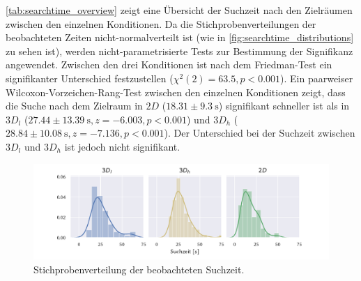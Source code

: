\autoref{tab:searchtime_overview} zeigt eine Übersicht der Suchzeit nach den Zielräumen zwischen den einzelnen Konditionen.
Da die Stichprobenverteilungen der beobachteten Zeiten nicht-normalverteilt ist (wie in \autoref{fig:searchtime_distributions} zu sehen ist), werden nicht-parametrisierte Tests zur Bestimmung der Signifikanz angewendet.
Zwischen den drei Konditionen ist nach dem Friedman-Test ein signifikanter Unterschied festzustellen ($\chi^2(2) = \num{63.5}, p < 0.001$).
Ein paarweiser Wilcoxon-Vorzeichen-Rang-Test zwischen den einzelnen Konditionen zeigt, dass die Suche nach dem Zielraum in $2D$ ($\num{18.31} \pm \SI{9.3}{\second}$) signifikant schneller ist als in $3D_l$ ($\num{27.44} \pm \SI{13.39}{\second}, z=\num{-6.003}, p<\num{0.001}$) und $3D_h$ ($\num{28.84} \pm \SI{10.08}{\second}, z=\num{-7.136}, p<0.001$).
Der Unterschied bei der Suchzeit zwischen $3D_l$ und $3D_h$ ist jedoch nicht signifikant.
\begin{figure}
    \centering
    \includegraphics[width=\linewidth]{figures/analysis/searchtime_distributions}
    \caption{Stichprobenverteilung der beobachteten Suchzeit.}
    \label{fig:searchtime_distributions}
\end{figure}

